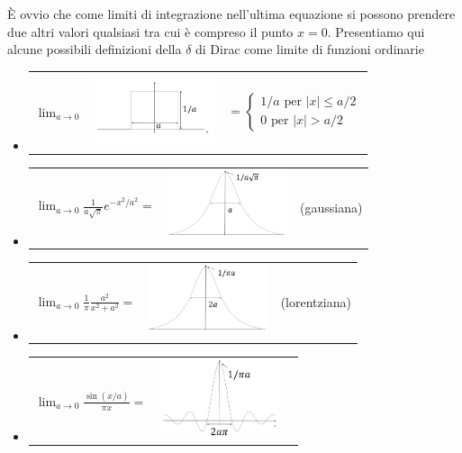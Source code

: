È ovvio che come limiti di integrazione nell'ultima equazione si possono prendere due altri valori qualsiasi tra cui è compreso il punto $x=0$.
Presentiamo qui alcune possibili definizioni della $\delta$ di Dirac come limite di funzioni ordinarie
\begin{itemize}
\item
\begin{tabular}{ >{\centering\arraybackslash} m{1.5cm} >{\centering\arraybackslash} m{3.5cm} >{\centering\arraybackslash} m{4.5cm}}
$\displaystyle{\lim _{a \rightarrow 0}}$ & \includegraphics[width=3.5cm]{immagini/cap_5/fig_5_1.png}  & $=\displaystyle{\begin{cases}
1/a \textrm{ per } \vert x \vert \leq a/2\\
0 \textrm{ per } \vert x \vert > a/2
\end{cases}}$
\end{tabular}
\item
\begin{tabular}{ >{\centering\arraybackslash} m{4cm} >{\centering\arraybackslash} m{3.5cm} >{\centering\arraybackslash} m{2cm}}
$\displaystyle{\lim _{a \rightarrow 0}\frac{1}{a\sqrt{\pi}}e^{-x^2/a^2}=}$ & \includegraphics[width=3.5cm]{immagini/cap_5/fig_5_2.png}  & (gaussiana)
\end{tabular}
\item 
\begin{tabular}{ >{\centering\arraybackslash} m{4cm} >{\centering\arraybackslash} m{3.5cm} >{\centering\arraybackslash} m{2cm}}
$\displaystyle{\lim _{a \rightarrow 0}\frac{1}{\pi}\frac{a^2}{x^2+a^2}}=$ & \includegraphics[width=3.5cm]{immagini/cap_5/fig_5_3.png}  & (lorentziana)
\end{tabular}
\item 
\begin{tabular}{ >{\centering\arraybackslash} m{4cm} >{\centering\arraybackslash} m{3.5cm} >{\centering\arraybackslash} m{2cm}}
$\displaystyle{\lim _{a \rightarrow 0}\frac{\sin(x/a)}{\pi x}}=$ & \includegraphics[width=3.5cm]{immagini/cap_5/fig_5_4.png}  & 
\end{tabular}
\end{itemize}
